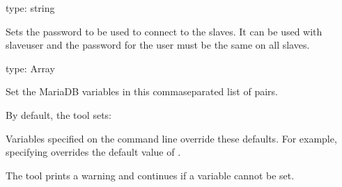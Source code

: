 \documentclass[letterpaper,10pt,english]{sphinxmanual}
\begin{document}

\begin{fulllineitems}
\label{\detokenize{mariadb-archiver:cmdoption-mariadb-archiver-slave-password}}
type: string

Sets the password to be used to connect to the slaves.
It can be used with \textendash{}slave\sphinxhyphen{}user and the password for the user must be the same
on all slaves.

\end{fulllineitems}


\begin{fulllineitems}
\label{\detokenize{mariadb-archiver:cmdoption-mariadb-archiver-set-vars}}
type: Array

Set the MariaDB variables in this comma\sphinxhyphen{}separated list of  pairs.

By default, the tool sets:

\begin{sphinxVerbatim}[commandchars=\\\{\}]
\end{sphinxVerbatim}

Variables specified on the command line override these defaults.  For
example, specifying  overrides the default
value of .

The tool prints a warning and continues if a variable cannot be set.

\end{fulllineitems}
\end{document}
